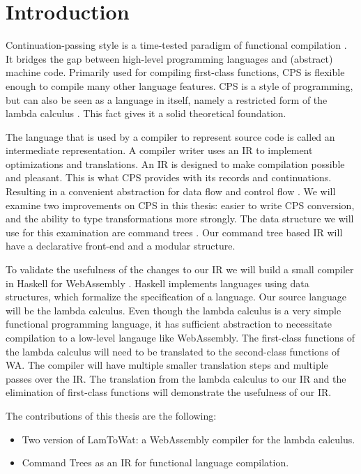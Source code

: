 
\chapter{\label{chap:introduction}Introduction}

Continuation-passing style is a time-tested paradigm of functional compilation \autocite{steele1978rabbit, DBLP:books/daglib/0022396}. It bridges the gap between high-level programming languages and (abstract) machine code. Primarily used for compiling first-class functions, CPS is flexible enough to compile many other language features. CPS is a style of programming, but can also be seen as a language in itself, namely a restricted form of the lambda calculus \autocite{barendregt1984lambda}. This fact gives it a solid theoretical foundation.

The language that is used by a compiler to represent source code is called an intermediate representation. A compiler writer uses an IR to implement optimizations and translations. An IR is designed to make compilation possible and pleasant. This is what CPS provides with its records and continuations. Resulting in a convenient abstraction for data flow and control flow \autocite{bruin2020framevm}. We will examine two improvements on CPS in this thesis: easier to write CPS conversion, and the ability to type transformations more strongly. The data structure we will use for this examination are command trees \autocite{commandtreespoulsen}. Our command tree based IR will have a declarative front-end and a modular structure.

To validate the usefulness of the changes to our IR we will build a small compiler in Haskell \autocite{haskellhomepage} for WebAssembly \autocite{webassemblyhomepage}. Haskell implements languages using data structures, which formalize the specification of a language. Our source language will be the lambda calculus. Even though the lambda calculus is a very simple functional programming language, it has sufficient abstraction to necessitate compilation to a low-level langauge like WebAssembly. The first-class functions of the lambda calculus will need to be translated to the second-class functions of WA. The compiler will have multiple smaller translation steps and multiple passes over the IR. The translation from the lambda calculus to our IR and the elimination of first-class functions will demonstrate the usefulness of our IR.

The contributions of this thesis are the following:
\begin{itemize}
\item Two version of LamToWat: a WebAssembly compiler for the lambda calculus.
\item Command Trees as an IR for functional language compilation.
\end{itemize}

